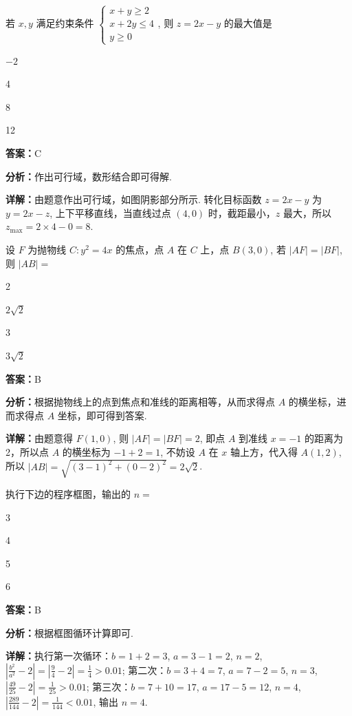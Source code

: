 \begin{question}[points=5]
若 $x, y$ 满足约束条件 $\begin{cases} x+y \ge 2 \\ x+2y \le 4 \\ y \ge 0 \end{cases}$, 则 $z = 2x - y$ 的最大值是
\begin{choices}
  \item $-2$
  \item 4
  \item 8
  \item 12
\end{choices}
\begin{solution}
\textbf{答案：}C

\textbf{分析：}作出可行域，数形结合即可得解.

\textbf{详解：}由题意作出可行域，如图阴影部分所示. 转化目标函数 $z=2x-y$ 为 $y=2x-z$, 上下平移直线，当直线过点 $(4,0)$ 时，截距最小，$z$ 最大，所以 $z_{\max}=2\times4-0=8$.
\end{solution}
\end{question}

\begin{question}[points=5]
设 $F$ 为抛物线 $C: y^2=4x$ 的焦点，点 $A$ 在 $C$ 上，点 $B(3,0)$, 若 $|AF| = |BF|$, 则 $|AB| =$
\begin{choices}
  \item 2
  \item $2\sqrt{2}$
  \item 3
  \item $3\sqrt{2}$
\end{choices}
\begin{solution}
\textbf{答案：}B

\textbf{分析：}根据抛物线上的点到焦点和准线的距离相等，从而求得点 $A$ 的横坐标，进而求得点 $A$ 坐标，即可得到答案.

\textbf{详解：}由题意得 $F(1,0)$, 则 $|AF|=|BF|=2$, 即点 $A$ 到准线 $x=-1$ 的距离为2，所以点 $A$ 的横坐标为 $-1+2=1$, 不妨设 $A$ 在 $x$ 轴上方，代入得 $A(1,2)$, 所以 $|AB|=\sqrt{(3-1)^2+(0-2)^2}=2\sqrt{2}$.
\end{solution}
\end{question}

\begin{question}[points=5]
执行下边的程序框图，输出的 $n =$
\begin{choices}
  \item 3
  \item 4
  \item 5
  \item 6
\end{choices}
\begin{solution}
\textbf{答案：}B

\textbf{分析：}根据框图循环计算即可.

\textbf{详解：}执行第一次循环：$b=1+2=3$, $a=3-1=2$, $n=2$, $\left|\frac{b^2}{a^2}-2\right|=\left|\frac{9}{4}-2\right|=\frac{1}{4}>0.01$; 第二次：$b=3+4=7$, $a=7-2=5$, $n=3$, $\left|\frac{49}{25}-2\right|=\frac{1}{25}>0.01$; 第三次：$b=7+10=17$, $a=17-5=12$, $n=4$, $\left|\frac{289}{144}-2\right|=\frac{1}{144}<0.01$, 输出 $n=4$.
\end{solution}
\end{question}

